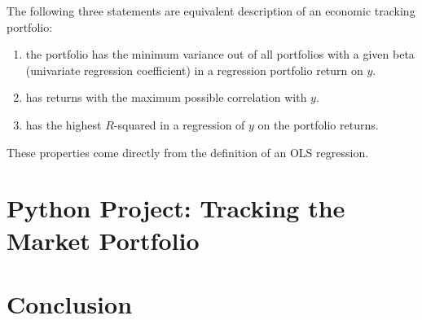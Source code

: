 The following three statements are equivalent description 
of an economic tracking portfolio: 
\begin{enumerate}
    \item the portfolio has the minimum variance out 
    of all portfolios with a given beta (univariate regression coefficient)
    in a regression portfolio return on $y$.
    \item has returns with the maximum possible correlation 
    with $y$.
    \item has the highest $R$-squared in a regression of
    $y$ on the portfolio returns.
\end{enumerate}

These properties come directly from the definition of an 
OLS regression. 

\section{Python Project: Tracking the Market Portfolio}

\section{Conclusion}